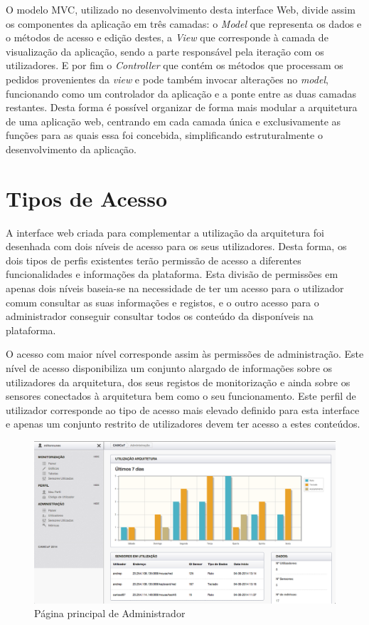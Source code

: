 O modelo MVC, utilizado no desenvolvimento desta interface Web, divide assim os componentes da aplicação em três camadas: o \textit{Model} que representa os dados e o métodos de acesso e edição destes, a \textit{View} que corresponde à camada de visualização da aplicação, sendo a parte responsável pela iteração com os utilizadores. E por fim o \textit{Controller} que contém os métodos que processam os pedidos provenientes da \textit{view} e pode também invocar alterações no \textit{model}, funcionando como um controlador da aplicação e a ponte entre as duas camadas restantes. Desta forma é possível organizar de forma mais modular a arquitetura de uma aplicação web, centrando em cada camada única e exclusivamente as funções para as quais essa foi concebida, simplificando estruturalmente o desenvolvimento da aplicação.

\section{Tipos de Acesso}

A interface web criada para complementar a utilização da arquitetura foi desenhada com dois níveis de acesso para os seus utilizadores. Desta forma, os dois tipos de perfis existentes terão permissão de acesso a diferentes funcionalidades e informações da plataforma. Esta divisão de permissões em apenas dois níveis baseia-se na necessidade de ter um acesso para o utilizador comum consultar as suas informações e registos, e o outro acesso para o administrador conseguir consultar todos os conteúdo da disponíveis na plataforma.

O acesso com maior nível corresponde assim às permissões de administração. Este nível de acesso disponibiliza um conjunto alargado de informações sobre os utilizadores da arquitetura, dos seus registos de monitorização e ainda sobre os sensores conectados à arquitetura bem como o seu funcionamento. Este perfil de utilizador corresponde ao tipo de acesso mais elevado definido para esta interface e apenas um conjunto restrito de utilizadores devem ter acesso a estes conteúdos.

 \begin{figure}[htb]
   \centering
   \includegraphics[scale=0.29]{Images/panel.png}
   \caption{Página principal de Administrador}
\end{figure}

